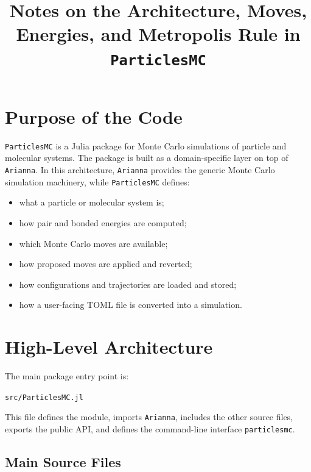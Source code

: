 \documentclass[11pt]{article}
\title{Notes on the Architecture, Moves, Energies, and Metropolis Rule in \texttt{ParticlesMC}}
\author{}
\date{}
\begin{document}
\maketitle

\section{Purpose of the Code}

\texttt{ParticlesMC} is a Julia package for Monte Carlo simulations of particle
and molecular systems. The package is built as a domain-specific layer on top of
\texttt{Arianna}. In this architecture, \texttt{Arianna} provides the generic
Monte Carlo simulation machinery, while \texttt{ParticlesMC} defines:

\begin{itemize}[nosep]
  \item what a particle or molecular system is;
  \item how pair and bonded energies are computed;
  \item which Monte Carlo moves are available;
  \item how proposed moves are applied and reverted;
  \item how configurations and trajectories are loaded and stored;
  \item how a user-facing TOML file is converted into a simulation.
\end{itemize}

\section{High-Level Architecture}

The main package entry point is:

\begin{center}
\texttt{src/ParticlesMC.jl}
\end{center}

This file defines the module, imports \texttt{Arianna}, includes the other source
files, exports the public API, and defines the command-line interface
\texttt{particlesmc}.

\subsection{Main Source Files}
\end{document}
